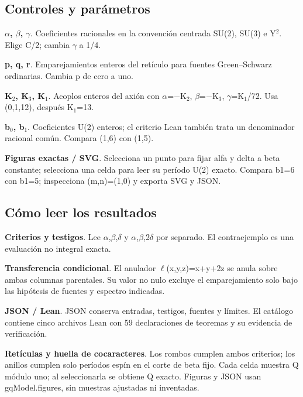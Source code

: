 \documentclass[11pt,a4paper]{article}
\begin{document}
\subsection*{Controles y parámetros}
\textbf{\ensuremath{\alpha}, \ensuremath{\beta}, \ensuremath{\gamma}}. Coeficientes racionales en la convención centrada SU(2), SU(3) e Y\ensuremath{{}^{2}}. Elige C/2; cambia \ensuremath{\gamma} a 1/4.

\textbf{p, q, r}. Emparejamientos enteros del retículo para fuentes Green--Schwarz ordinarias. Cambia p de cero a uno.

\textbf{K\ensuremath{{}_{2}}, K\ensuremath{{}_{3}}, K\ensuremath{{}_{1}}}. Acoplos enteros del axión con \ensuremath{\alpha}=\ensuremath{-}K\ensuremath{{}_{2}}, \ensuremath{\beta}=\ensuremath{-}K\ensuremath{{}_{3}}, \ensuremath{\gamma}=K\ensuremath{{}_{1}}/72. Usa (0,1,12), después K\ensuremath{{}_{1}}=13.

\textbf{b\ensuremath{{}_{0}}, b\ensuremath{{}_{1}}}. Coeficientes U(2) enteros; el criterio Lean también trata un denominador racional común. Compara (1,6) con (1,5).

\textbf{Figuras exactas / SVG}. Selecciona un punto para fijar alfa y delta a beta constante; selecciona una celda para leer su período U(2) exacto. Compara b1=6 con b1=5; inspecciona (m,n)=(1,0) y exporta SVG y JSON.

\subsection*{Cómo leer los resultados}
\textbf{Criterios y testigos}. Lee \ensuremath{\alpha},\ensuremath{\beta},\ensuremath{\delta} y \ensuremath{\alpha},\ensuremath{\beta},2\ensuremath{\delta} por separado. El contraejemplo es una evaluación no integral exacta.

\textbf{Transferencia condicional}. El anulador \ensuremath{\ell}(x,y,z)=x+y+2z se anula sobre ambas columnas parentales. Su valor no nulo excluye el emparejamiento solo bajo las hipótesis de fuentes y espectro indicadas.

\textbf{JSON / Lean}. JSON conserva entradas, testigos, fuentes y límites. El catálogo contiene cinco archivos Lean con 59 declaraciones de teoremas y su evidencia de verificación.

\textbf{Retículas y huella de cocaracteres}. Los rombos cumplen ambos criterios; los anillos cumplen solo períodos espín en el corte de beta fijo. Cada celda muestra Q módulo uno; al seleccionarla se obtiene Q exacto. Figuras y JSON usan gqModel.figures, sin muestras ajustadas ni inventadas.
\end{document}
